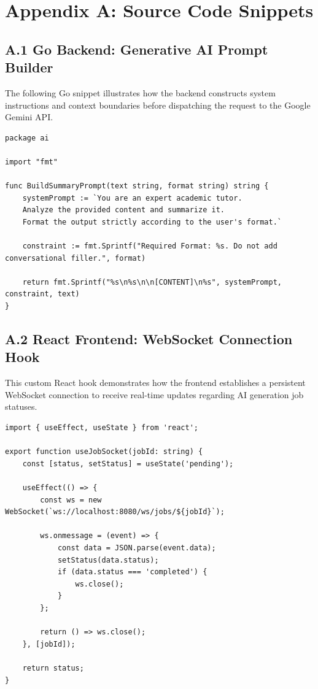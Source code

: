 %
%
\chapter{Appendix A: Source Code Snippets}

\section*{A.1 Go Backend: Generative AI Prompt Builder}
The following Go snippet illustrates how the backend constructs system instructions and context boundaries before dispatching the request to the Google Gemini API.

\begin{verbatim}
package ai

import "fmt"

func BuildSummaryPrompt(text string, format string) string {
    systemPrompt := `You are an expert academic tutor. 
    Analyze the provided content and summarize it. 
    Format the output strictly according to the user's format.`
    
    constraint := fmt.Sprintf("Required Format: %s. Do not add conversational filler.", format)
    
    return fmt.Sprintf("%s\n%s\n\n[CONTENT]\n%s", systemPrompt, constraint, text)
}
\end{verbatim}

\section*{A.2 React Frontend: WebSocket Connection Hook}
This custom React hook demonstrates how the frontend establishes a persistent WebSocket connection to receive real-time updates regarding AI generation job statuses.

\begin{verbatim}
import { useEffect, useState } from 'react';

export function useJobSocket(jobId: string) {
    const [status, setStatus] = useState('pending');

    useEffect(() => {
        const ws = new WebSocket(`ws://localhost:8080/ws/jobs/${jobId}`);
        
        ws.onmessage = (event) => {
            const data = JSON.parse(event.data);
            setStatus(data.status);
            if (data.status === 'completed') {
                ws.close();
            }
        };

        return () => ws.close();
    }, [jobId]);

    return status;
}
\end{verbatim}



